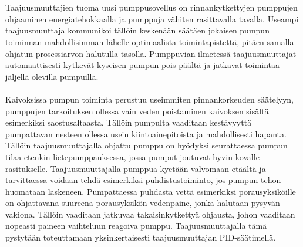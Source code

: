 \documentclass[finnish,12pt,a4paper,pdftex,elec,utf8]{aaltothesis}
\begin{document}
\\\\
Taajuusmuuttajien tuoma uusi pumppusovellus on rinnankytkettyjen pumppujen ohjaaminen energiatehokkaalla ja pumppuja vähiten rasittavalla tavalla. Useampi taajuusmuuttaja kommunikoi tällöin keskenään säätäen jokaisen pumpun toiminnan mahdollisimman lähelle optimaalista toimintapistettä, pitäen samalla ohjatun prosessiarvon halutulla tasolla. Pumppuvian ilmetessä taajuusmuuttajat automaattisesti kytkevät kyseisen pumpun pois päältä ja jatkavat toimintaa jäljellä olevilla pumpuilla. \cite{ACQ810} 
\\\\
Kaivoksissa pumpun toiminta perustuu useimmiten pinnankorkeuden säätelyyn, pumppujen tarkoituksen ollessa vain veden poistaminen kaivoksen sisältä esimerkiksi saostusaltaasta. Tällöin pumpulta vaaditaan kestävyyttä pumpattavan nesteen ollessa usein kiintoainepitoista ja mahdollisesti hapanta. Tällöin taajuusmuuttajalla ohjattu pumppu on hyödyksi seurattaessa pumpun tilaa etenkin lietepumppauksessa, jossa pumput joutuvat hyvin kovalle rasitukselle. Taajuusmuuttajalla pumppua kyetään valvomaan etäältä ja tarvittaessa voidaan tehdä esimerkiksi puhdistustoiminto, jos pumpun tehon huomataan laskeneen. Pumpattaessa puhdasta vettä esimerkiksi porausyksiköille on ohjattavana suureena porausyksikön vedenpaine, jonka halutaan pysyvän vakiona. Tällöin vaaditaan jatkuvaa takaisinkytkettyä ohjausta, johon vaaditaan nopeasti paineen vaihteluun reagoiva pumppu. Taajuusmuuttajalla tämä pystytään toteuttamaan yksinkertaisesti taajuusmuuttajan PID-säätimellä.
\end{document}
